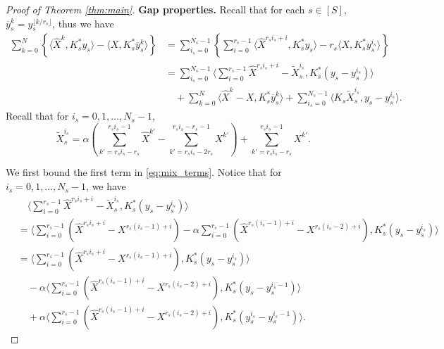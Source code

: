 \documentclass[10pt]{article}
\begin{document}
\begin{proof}[Proof of Theorem \ref{thm:main}]
\textbf{Gap properties.} Recall that for each $s\in [S]$, $\overline{y}_s^k = y_s^{\lfloor k/r_s\rfloor}$, thus we have
\begin{align}\label{eq:mix_terms}
 \sum_{k=0}^{N}\left\{\langle \widehat{X}^{k},K_s^*y_s\rangle - \langle X,K^*_s\overline{y}_s^{k}\rangle\right\}&= \sum_{i_s=0}^{N_s-1}\left\{\sum_{i=0}^{r_s-1}\langle \widehat{X}^{r_si_s+i},K^*_{s}y_s\rangle - r_s\langle X,K^*_{s}y_s^{i_s}\rangle\right\}\nonumber\\
    &= \sum_{i_s=0}^{N_s-1}\langle\sum_{i=0}^{r_s-1} \widehat{X}^{r_si_s+i}-\widetilde{X}_{s}^{i_s},K^*_{s}(y_s-y_s^{i_s})\rangle \nonumber \\
    &\quad +\sum_{k=0}^N \langle \widehat{X}^{k}-X,K^*_{s}\overline{y}_s^{k}\rangle +\sum_{i_s=0}^{N_s-1} \langle K_{s}\widetilde{X}_{s}^{i_s}, y_s- y_s^{i_s}\rangle .
\end{align}
Recall that for $i_s=0,1,\ldots,N_s-1$,
\begin{displaymath}
    \widetilde{X}_{s}^{i_s} =\alpha(\sum_{k'=r_si_s-r_s}^{r_si_s-1}\widehat{X}^{k'} - \sum_{k'=r_si_s-2r_s}^{r_si_s-r_s-1}{X}^{k'}) + \sum_{k'=r_si_s-r_s}^{r_si_s-1}X^{k'}.
\end{displaymath}

We first bound the first term in \eqref{eq:mix_terms}. Notice that for $i_s=0,1,\ldots,N_s-1$, we have
\begin{align*}
    &\quad \langle\sum_{i=0}^{r_s-1} \widehat{X}^{r_si_s+i}-\widetilde{X}_{s}^{i_s},K^*_{s}(y_s-y_s^{i_s})\rangle\\
    & = \langle \sum_{i=0}^{r_s-1}(\widehat{X}^{r_si_s+i}-X^{r_s(i_s-1)+i}) - \alpha\sum_{i=0}^{r_s-1} (\widehat{X}^{r_s(i_s-1)+i}-X^{r_s(i_s-2)+i}),K^*_{s}(y_s-y_s^{i_s})\rangle\\
    & = \langle \sum_{i=0}^{r_s-1}(\widehat{X}^{r_si_s+i}-X^{r_s(i_s-1)+i}) ,K^*_{s}(y_s-y_s^{i_s})\rangle\\
    &\quad -\alpha \langle \sum_{i=0}^{r_s-1} (\widehat{X}^{r_s(i_s-1)+i}-X^{r_s(i_s-2)+i}),K^*_{s}(y_s-y_s^{i_s-1})\rangle\\
    & \quad + \alpha \langle \sum_{i=0}^{r_s-1} (\widehat{X}^{r_s(i_s-1)+i}-X^{r_s(i_s-2)+i}),K^*_{s}(y_s^{i_s}-y_s^{i_s-1})\rangle.
\end{align*}


\end{proof}
\end{document}
